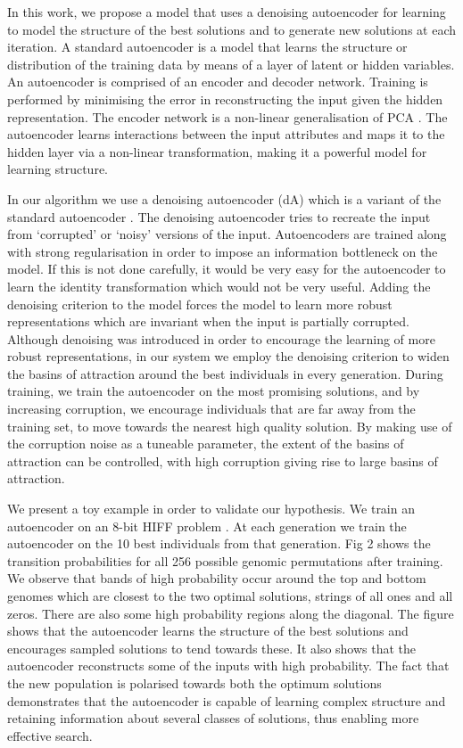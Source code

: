 \documentclass[runningheads,a4paper]{llncs}
\begin{document}
In this work, we propose a model that uses a denoising autoencoder for learning to model the structure of the best solutions and to generate new solutions at each iteration.
A standard autoencoder is a model that learns the structure or distribution of the training data by means of a layer of latent or hidden variables. An autoencoder is comprised of an encoder and decoder network. Training is performed by minimising the error in reconstructing the input given the hidden representation.  The encoder network is a non-linear generalisation of PCA \cite{hinton2006reducing}. The autoencoder learns interactions between the input attributes and maps it to the hidden layer via a non-linear transformation, making it a powerful model for learning structure. 

In our algorithm we use a denoising autoencoder (dA) which is a variant of the standard autoencoder \cite{vincent2008extracting}. The denoising autoencoder tries to recreate the input from `corrupted' or `noisy' versions of the input. Autoencoders are trained along with strong regularisation in order to impose an information bottleneck on the model. If this is not done carefully, it would be very easy for the autoencoder to learn the identity transformation which would not be very useful. Adding the denoising criterion to the model forces the model to learn more robust representations which are invariant when the input is partially corrupted. Although denoising was introduced in order to encourage the learning of more robust representations, in our system we employ the denoising criterion to widen the basins of attraction around the best individuals in every generation. During training, we train the autoencoder on the most promising solutions, and by increasing corruption, we encourage individuals that are far away from the training set, to move towards the nearest high quality solution. By making use of the corruption noise as a tuneable parameter, the extent of the basins of attraction can be controlled, with high corruption giving rise to large basins of attraction. 

We present a toy example in order to validate our hypothesis. We train an autoencoder on an 8-bit HIFF problem \cite{Watson}. At each generation we train the autoencoder on the 10 best individuals from that generation. Fig 2 shows the transition probabilities for all 256 possible genomic permutations after training. We observe that bands of high probability occur around the top and bottom genomes which are closest to the two optimal solutions, strings of all ones and all zeros. There are also some high probability regions along the diagonal. The figure shows that the autoencoder learns the structure of the best solutions and encourages sampled solutions to tend towards these. It also shows that the autoencoder reconstructs some of the inputs with high probability. The fact that the new population is polarised towards both the optimum solutions demonstrates that the autoencoder is capable of learning complex structure and retaining information about several classes of solutions, thus enabling more effective search. 
\end{document}
